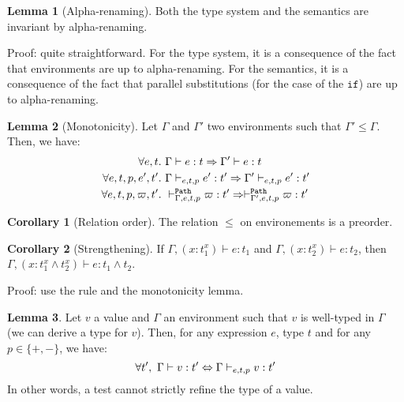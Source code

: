 \documentclass[a4paper]{article}
\theoremstyle{definition}
\newtheorem{lemma}{Lemma}
\newtheorem{corollary}{Corollary}
\begin{document}
        \begin{lemma}[Alpha-renaming]
          Both the type system and the semantics are invariant by alpha-renaming.
        \end{lemma}
        Proof: quite straightforward.
        For the type system, it is a consequence of the fact that environments are up to alpha-renaming.
        For the semantics, it is a consequence of the fact that parallel substitutions (for the case of the $\texttt{if}$)
        are up to alpha-renaming.
    
        \begin{lemma}[Monotonicity]
          Let $\Gamma$ and $\Gamma'$ two environments such that $\Gamma' \leq \Gamma$.
          Then, we have:
          \begin{align*}
            \forall e,t.\ &\Gamma \vdash e:t \Rightarrow \Gamma' \vdash e:t\\
            \forall e,t,p,e',t'.\ &\Gamma \cvdash p e t e':t' \Rightarrow \Gamma' \cvdash p e t e':t'\\
            \forall e,t,p,\varpi,t'.\ &\pvdash \Gamma p e t \varpi:t' \Rightarrow \pvdash {\Gamma'} p e t \varpi:t'
          \end{align*}
        \end{lemma}

        \begin{corollary}[Relation order]
          The relation $\leq$ on environements is a preorder.
        \end{corollary}
    
        \begin{corollary}[Strengthening]
          If $\Gamma, (x:t_1^x) \vdash e:t_1$ and $\Gamma, (x:t_2^x) \vdash e:t_2$, then
          $\Gamma, (x:t_1^x \land t_2^x) \vdash e:t_1\land t_2$.
        \end{corollary}
        Proof: use the  rule and the monotonicity lemma.

        \begin{lemma}
          Let $v$ a value and $\Gamma$ an environment such that $v$ is well-typed in $\Gamma$ (we can derive a type for $v$).
          Then, for any expression $e$, type $t$ and for any $p\in\{+,-\}$, we have:
          \[\forall t',\ \Gamma \vdash v:t' \Leftrightarrow \Gamma \cvdash p e t v:t'\]
          In other words, a test cannot strictly refine the type of a value.
        \end{lemma}
\end{document}
